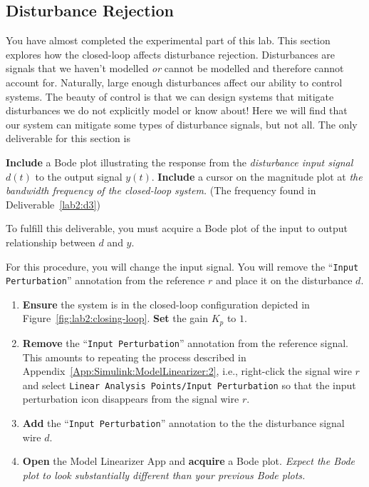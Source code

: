 \subsection{Disturbance Rejection}
You have almost completed the experimental part of this lab. This section
explores how the closed-loop affects disturbance rejection. Disturbances are
signals that we haven't modelled \emph{or} cannot be modelled and therefore
cannot account for. Naturally, large enough disturbances affect our ability to
control systems. The beauty of control is that we can design systems that
mitigate disturbances we do not explicitly model or know about! Here we will
find that our system can mitigate some types of disturbance signals, but not
all. The only deliverable for this section is
%
\begin{deliverable}[label={lab2:d4}]
  \textbf{Include} a Bode plot illustrating the response from the
  \emph{disturbance input signal} \(d(t)\) to the output signal \(y(t).\)
  \textbf{Include} a cursor on the magnitude plot at \emph{the bandwidth
  frequency of the closed-loop system.} (The frequency found in
  Deliverable~\ref{lab2:d3})
\end{deliverable}
%
To fulfill this deliverable, you must acquire a Bode plot of the input to
output relationship between \(d\) and \(y.\)
%
\begin{procedure}[label={proc:lab2:p5}]
  For this procedure, you will change the input signal. You will remove the
  ``\texttt{Input Perturbation}'' annotation from the reference \(r\) and
  place it on the disturbance \(d.\)

  \begin{enumerate}[label=(\arabic*)]
    \item{
      \textbf{Ensure} the system is in the closed-loop configuration
      depicted in Figure~\ref{fig:lab2:closing-loop}.
      \textbf{Set} the gain \(K_p\) to \(1.\)
    }
    \item{
      \textbf{Remove} the ``\texttt{Input Perturbation}'' annotation from
      the reference signal. This amounts to repeating the process described
      in Appendix~\ref{App:Simulink:ModelLinearizer:2}, i.e., right-click the
      signal wire \(r\) and select
      \texttt{Linear Analysis Points/Input Perturbation} so that the
      input perturbation icon disappears from the signal wire \(r.\)
    }
    \item{
      \textbf{Add} the ``\texttt{Input Perturbation}'' annotation to the
      the disturbance signal wire \(d.\)
    }
    \item{
      \textbf{Open} the Model Linearizer App and \textbf{acquire} a Bode
      plot. \emph{Expect the Bode plot to look substantially different than
      your previous Bode plots.}
    }
  \end{enumerate}
\end{procedure}

